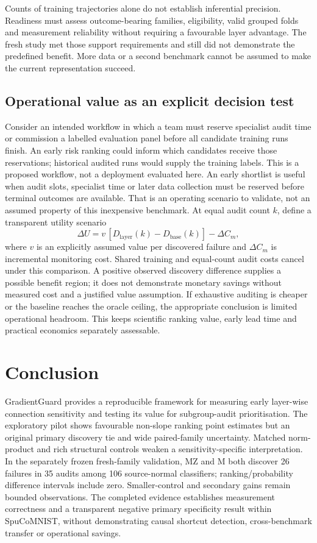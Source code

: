 Counts of training trajectories alone do not establish inferential precision. Readiness must assess outcome-bearing families, eligibility, valid grouped folds and measurement reliability without requiring a favourable layer advantage. The fresh study met those support requirements and still did not demonstrate the predefined benefit. More data or a second benchmark cannot be assumed to make the current representation succeed.

\subsection{Operational value as an explicit decision test}
Consider an intended workflow in which a team must reserve specialist audit time or commission a labelled evaluation panel before all candidate training runs finish. An early risk ranking could inform which candidates receive those reservations; historical audited runs would supply the training labels. This is a proposed workflow, not a deployment evaluated here. An early shortlist is useful when audit slots, specialist time or later data collection must be reserved before terminal outcomes are available. That is an operating scenario to validate, not an assumed property of this inexpensive benchmark. At equal audit count $k$, define a transparent utility scenario
\begin{equation}
\Delta U=v\,[D_{\mathrm{layer}}(k)-D_{\mathrm{base}}(k)]-\Delta C_m,
\tag{9}\end{equation}
where $v$ is an explicitly assumed value per discovered failure and $\Delta C_m$ is incremental monitoring cost. Shared training and equal-count audit costs cancel under this comparison. A positive observed discovery difference supplies a possible benefit region; it does not demonstrate monetary savings without measured cost and a justified value assumption. If exhaustive auditing is cheaper or the baseline reaches the oracle ceiling, the appropriate conclusion is limited operational headroom. This keeps scientific ranking value, early lead time and practical economics separately assessable.

\section{Conclusion}
GradientGuard provides a reproducible framework for measuring early layer-wise connection sensitivity and testing its value for subgroup-audit prioritisation. The exploratory pilot shows favourable non-slope ranking point estimates but an original primary discovery tie and wide paired-family uncertainty. Matched norm-product and rich structural controls weaken a sensitivity-specific interpretation. In the separately frozen fresh-family validation, MZ and M both discover 26 failures in 35 audits among 106 source-normal classifiers; ranking/probability difference intervals include zero. Smaller-control and secondary gains remain bounded observations. The completed evidence establishes measurement correctness and a transparent negative primary specificity result within SpuCoMNIST, without demonstrating causal shortcut detection, cross-benchmark transfer or operational savings.


